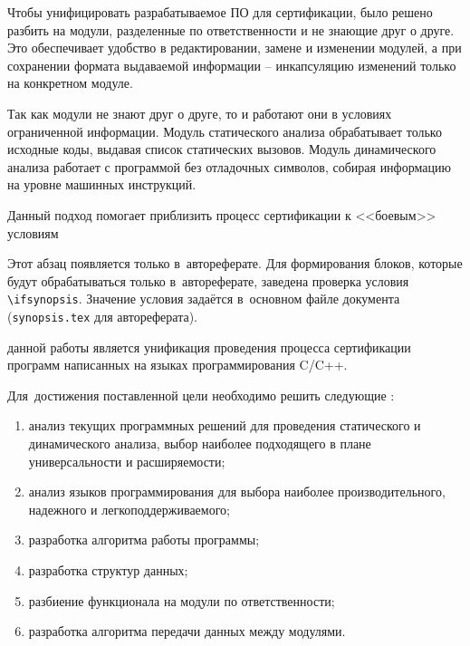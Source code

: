 Чтобы унифицировать разрабатываемое ПО для сертификации, было решено разбить {\ProgModule}
на модули, разделенные по ответственности и не знающие друг о друге. Это обеспечивает
удобство в редактировании, замене и изменении модулей, а при сохранении формата выдаваемой информации
 -- инкапсуляцию изменений только на конкретном модуле.

Так как модули не знают друг о друге, то и работают они в условиях ограниченной информации.
Модуль статического анализа обрабатывает только исходные коды, выдавая список статических
вызовов. Модуль динамического анализа работает с программой без отладочных символов,
собирая информацию на уровне машинных инструкций.

Данный подход помогает приблизить процесс сертификации к <<боевым>> условиям

\ifsynopsis
Этот абзац появляется только в~автореферате.
Для формирования блоков, которые будут обрабатываться только в~автореферате,
заведена проверка условия \verb!\!\verb!ifsynopsis!.
Значение условия задаётся в~основном файле документа (\verb!synopsis.tex! для
автореферата).
\else
\fi


{\aim} данной работы является унификация проведения процесса сертификации
программ написанных на языках программирования C/C++.

Для~достижения поставленной цели необходимо решить следующие {\tasks}:
\begin{enumerate}[label={\arabic*)}]
  \item анализ текущих программных решений для проведения 
        статического и динамического анализа, 
        выбор наиболее подходящего в плане универсальности 
        и расширяемости;
  \item анализ языков программирования для выбора наиболее производительного,
        надежного и легкоподдерживаемого;
  \item разработка алгоритма работы программы;
  \item разработка структур данных;
  \item разбиение функционала {\ProgModule} на модули по ответственности;
  \item разработка алгоритма передачи данных между модулями.
\end{enumerate}


